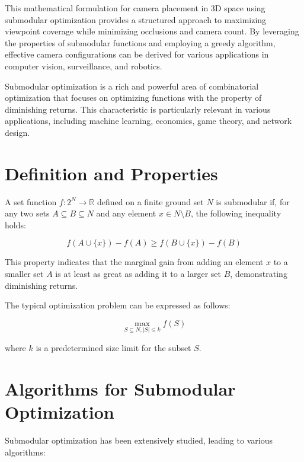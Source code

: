 This mathematical formulation for camera placement in 3D space using submodular optimization provides a structured approach to maximizing viewpoint coverage while minimizing occlusions and camera count. By leveraging the properties of submodular functions and employing a greedy algorithm, effective camera configurations can be derived for various applications in computer vision, surveillance, and robotics.


Submodular optimization is a rich and powerful area of combinatorial optimization that focuses on optimizing functions with the property of diminishing returns. This characteristic is particularly relevant in various applications, including machine learning, economics, game theory, and network design.

\section{Definition and Properties}
A set function \( f: 2^N \to \mathbb{R} \) defined on a finite ground set \( N \) is submodular if, for any two sets \( A \subseteq B \subseteq N \) and any element \( x \in N \setminus B \), the following inequality holds:

\[
f(A \cup \{x\}) - f(A) \geq f(B \cup \{x\}) - f(B)
\]

This property indicates that the marginal gain from adding an element \( x \) to a smaller set \( A \) is at least as great as adding it to a larger set \( B \), demonstrating diminishing returns.

The typical optimization problem can be expressed as follows:

\[
\max_{S \subseteq N, |S| \leq k} f(S)
\]

where \( k \) is a predetermined size limit for the subset \( S \).

\section{Algorithms for Submodular Optimization}
Submodular optimization has been extensively studied, leading to various algorithms:

